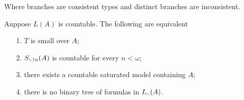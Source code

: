 \documentclass[creche.tex]{subfiles}
\begin{document}
\begin{definition}
Where branches are consistent types and distinct branches are inconsistent.\QED
\end{definition}


\begin{proposition}\label{prop_small_equivalents}
Auppose $L(A)$ is countable. The following are equivalent\nobreak
\begin{itemize}   
\item[1.] $T$ is small over $A$;
\item[2.] $S_{{\color{brown} x}\restriction n}(A)$ is countable for every $n<\omega$;
\item[3.] there exists a countable saturated model containing $A$;
\item[4.] there is no binary tree of formulas in $L_{\color{brown} x}(A)$.
\end{itemize}
\end{proposition}
\end{document}
